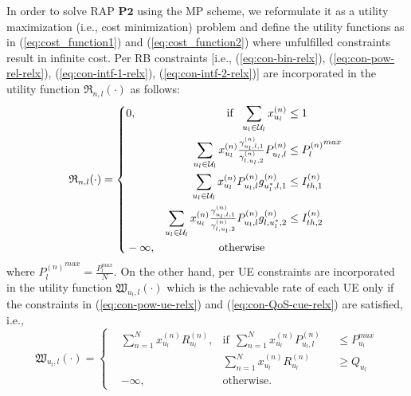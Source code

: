 \documentclass[twocolumn,10pt]{IEEEtran}
\begin{document}
In order to solve RAP $\mathbf{P2}$ using the MP scheme, we reformulate it as a utility maximization (i.e., cost minimization) problem and define the utility functions as in (\ref{eq:cost_function1}) and (\ref{eq:cost_function2}) where unfulfilled constraints result in infinite cost. Per RB constraints [i.e., (\ref{eq:con-bin-relx}), (\ref{eq:con-pow-rel-relx}), (\ref{eq:con-intf-1-relx}), (\ref{eq:con-intf-2-relx})] are incorporated in the utility function $\mathfrak{R}_{n,l}(\cdot)$ as follows:
\begin{equation}
\label{eq:cost_function1}
  \hspace{-0.15em}\mathfrak{R}_{n,l}(\cdot)  = \left\{\begin{alignedat}{2}
    & 0, & \text{if} ~~ \displaystyle \sum_{u_l \in \mathcal{U}_l} x_{u_l}^{(n)} & \leq 1 \\
    & & \displaystyle \sum_{u_l \in \mathcal{U}_l }  x_{u_l}^{(n)} \tfrac{\gamma_{u_l, l, 1}^{(n)}}{\gamma_{l, u_l, 2}^{(n)}} P_{u_l, l}^{(n)} & \leq  {P_l^{(n)}}^{max} \\
    & & \displaystyle  \sum_{u_l \in \mathcal{U}_l } x_{u_l}^{(n)} P_{u_l, l}^{(n)} g_{{u_l^*}, l, 1}^{(n)}  &\leq I_{th, 1}^{(n)} \\
    &  & \displaystyle  \quad \sum_{u_l \in \mathcal{U}_l } x_{u_l}^{(n)}  \tfrac{\gamma_{u_l, l, 1}^{(n)}}{\gamma_{l, u_l, 2}^{(n)}} P_{u_l, l}^{(n)}  g_{l, {u_l^*}, 2}^{(n)} & \leq I_{th, 2}^{(n)} \\
    & - \infty, & \text{otherwise} \hspace{2em}
  \end{alignedat}\right.
\end{equation}
where $ {P_l^{(n)}}^{max} = \frac{ P_l^{max} }{N}$. On the other hand, per UE constraints are incorporated in the utility function $\mathfrak{W}_{u_l, l}(\cdot)$ which is the achievable rate of each UE only if the constraints in (\ref{eq:con-pow-ue-relx}) and (\ref{eq:con-QoS-cue-relx}) are satisfied, i.e., 
\begin{equation}
\label{eq:cost_function2}
\mathfrak{W}_{u_l, l}(\cdot)  = \left\{\begin{alignedat}{2}
    &   \sum_{n =1}^N   x_{u_l}^{(n)} R_{u_l}^{(n)}, & \text{if} ~~ \displaystyle \sum_{n =1}^N x_{u_l}^{(n)} P_{u_l, l}^{(n)} & \leq  P_{u_l}^{max} \\
    & & \sum_{n =1}^N   x_{u_l}^{(n)} R_{u_l}^{(n)}  & \geq  Q_{u_l}\\
    & - \infty, & \text{otherwise.} \hspace{5em}
  \end{alignedat}\right.
\end{equation}
\end{document}
